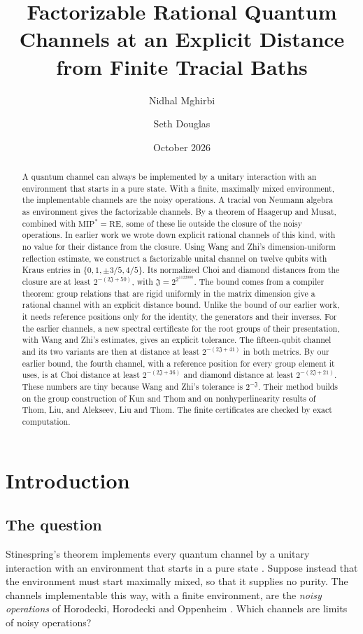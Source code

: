 \documentclass[11pt]{article}
\title{Factorizable Rational Quantum Channels at an Explicit Distance from Finite Tracial Baths}
\author{Nidhal Mghirbi \and Seth Douglas}
\date{October 2026}
\newcommand{\cJ}{\mathfrak J}
\begin{document}
\maketitle
\begin{abstract}
A quantum channel can always be implemented by a unitary interaction with an environment that starts in a pure state.  With a finite, maximally mixed environment, the implementable channels are the noisy operations.  A tracial von Neumann algebra as environment gives the factorizable channels.  By a theorem of Haagerup and Musat, combined with $\mathrm{MIP}^*=\mathrm{RE}$, some of these lie outside the closure of the noisy operations.  In earlier work we wrote down explicit rational channels of this kind, with no value for their distance from the closure.  Using Wang and Zhi's dimension-uniform reflection estimate, we construct a factorizable unital channel on twelve qubits with Kraus entries in $\{0,1,\pm3/5,4/5\}$.  Its normalized Choi and diamond distances from the closure are at least $2^{-(2\cJ+50)}$, with $\cJ=2^{2^{1122000}}$.  The bound comes from a compiler theorem: group relations that are rigid uniformly in the matrix dimension give a rational channel with an explicit distance bound.  Unlike the bound of our earlier work, it needs reference positions only for the identity, the generators and their inverses.  For the earlier channels, a new spectral certificate for the root groups of their presentation, with Wang and Zhi's estimates, gives an explicit tolerance.  The fifteen-qubit channel and its two variants are then at distance at least $2^{-(2\cJ+41)}$ in both metrics.  By our earlier bound, the fourth channel, with a reference position for every group element it uses, is at Choi distance at least $2^{-(2\cJ+36)}$ and diamond distance at least $2^{-(2\cJ+21)}$.  These numbers are tiny because Wang and Zhi's tolerance is $2^{-\cJ}$.  Their method builds on the group construction of Kun and Thom and on nonhyperlinearity results of Thom, Liu, and Alekseev, Liu and Thom.  The finite certificates are checked by exact computation.
\end{abstract}

\section{Introduction}\label{sec:intro}

\subsection{The question}
Stinespring's theorem implements every quantum channel by a unitary interaction with an environment that starts in a pure state \cite{Stinespring55}.  Suppose instead that the environment must start maximally mixed, so that it supplies no purity.  The channels implementable this way, with a finite environment, are the \emph{noisy operations} of Horodecki, Horodecki and Oppenheim \cite{HHO03}.  Which channels are limits of noisy operations?
\end{document}
